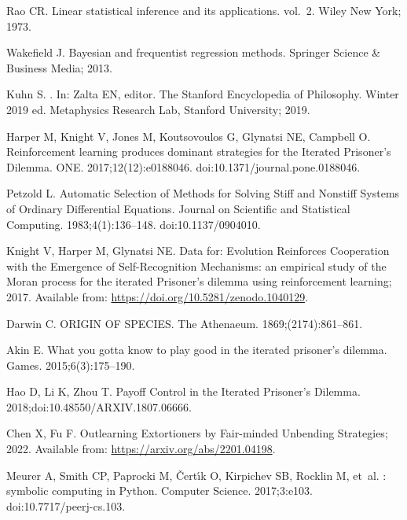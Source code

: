 \documentclass[10pt,letterpaper]{article}
\begin{document}
\begin{thebibliography}{10}
Rao CR.
\newblock Linear statistical inference and its applications. vol.~2.
\newblock Wiley New York; 1973.

Wakefield J.
\newblock Bayesian and frequentist regression methods.
\newblock Springer Science \& Business Media; 2013.

Kuhn S.
.
\newblock In: Zalta EN, editor. The {Stanford} Encyclopedia of Philosophy.
  {W}inter 2019 ed. Metaphysics Research Lab, Stanford University; 2019.

Harper M, Knight V, Jones M, Koutsovoulos G, Glynatsi NE, Campbell O.
\newblock Reinforcement learning produces dominant strategies for the Iterated
  Prisoner's Dilemma.
 {ONE}. 2017;12(12):e0188046.
\newblock doi:{10.1371/journal.pone.0188046}.

Petzold L.
\newblock Automatic Selection of Methods for Solving Stiff and Nonstiff Systems
  of Ordinary Differential Equations.
 Journal on Scientific and Statistical Computing.
  1983;4(1):136--148.
\newblock doi:{10.1137/0904010}.

Knight V, Harper M, Glynatsi NE. {Data for: Evolution Reinforces Cooperation
  with the Emergence of Self-Recognition Mechanisms: an empirical study of the
  Moran process for the iterated Prisoner's dilemma using reinforcement
  learning}; 2017.
\newblock Available from: \url{https://doi.org/10.5281/zenodo.1040129}.

Darwin C.
\newblock ORIGIN OF SPECIES.
\newblock The Athenaeum. 1869;(2174):861--861.

Akin E.
\newblock What you gotta know to play good in the iterated prisoner’s
  dilemma.
\newblock Games. 2015;6(3):175--190.

Hao D, Li K, Zhou T.
\newblock Payoff Control in the Iterated Prisoner's Dilemma.
  2018;doi:{10.48550/ARXIV.1807.06666}.

Chen X, Fu F. Outlearning Extortioners by Fair-minded Unbending Strategies;
  2022.
\newblock Available from: \url{https://arxiv.org/abs/2201.04198}.

Meurer A, Smith CP, Paprocki M, {\v{C}}ert{\'{\i}}k O, Kirpichev SB, Rocklin M,
  et~al.
: symbolic computing in Python.
 Computer Science. 2017;3:e103.
\newblock doi:{10.7717/peerj-cs.103}.


\end{thebibliography}
\end{document}
